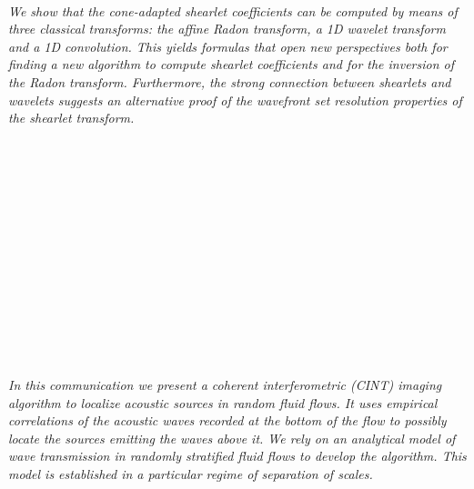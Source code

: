 \begin{multicols}{2}
\\ 
        \\
        \\\\
        \\
        \\\\
        \\
        \\\\
\\
      \textit{We show that the cone-adapted shearlet coefficients can be computed by means of three classical transforms: the affine Radon transform, a 1D wavelet transform and a 1D convolution. This yields formulas that open new perspectives both for finding a new algorithm to compute shearlet coefficients and for the inversion of the Radon transform. Furthermore, the strong connection between shearlets and wavelets suggests an alternative proof of the wavefront set resolution properties of the shearlet transform. }\\
\\ 
        \\
        \\\\
        \\
        \\\\
        \\
        \\\\
        \\
        \\\\
\\
      \textit{In this communication we present a coherent interferometric (CINT) imaging algorithm to localize acoustic sources in random fluid flows. It uses empirical correlations of the acoustic waves recorded at the bottom of the flow to possibly locate the sources emitting the waves above it. We rely on an analytical model of wave transmission in randomly stratified fluid flows to develop the algorithm. This model is established in a particular regime of separation of scales.}\\

\end{multicols}
